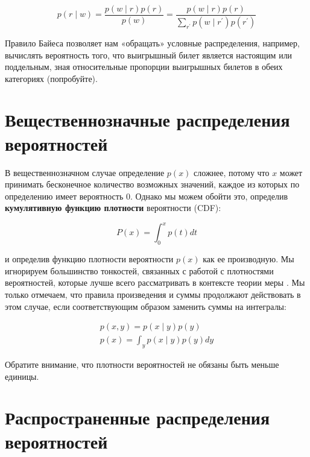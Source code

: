 \begin{equation}
    p(r\mid w)=\frac{p(w \mid r)p(r)}{p(w)} =\frac{p(w \mid r)p(r)}{\sum_{r^\prime}p(w \mid r^\prime)p(r^\prime)}
    \label{eq:bayes_rule}
\end{equation}

Правило Байеса позволяет нам «обращать» условные распределения, например, вычислять вероятность того, что выигрышный билет является настоящим или поддельным, зная относительные пропорции выигрышных билетов в обеих категориях (попробуйте).

\section{Вещественнозначные распределения вероятностей}

В вещественнозначном случае определение $p(x)$ сложнее, потому что $x$ может принимать бесконечное количество возможных значений, каждое из которых по определению имеет вероятность $0$. Однако мы можем обойти это, определив \textbf{кумулятивную функцию плотности} вероятности (CDF):

$$
P(x)=\int_{0}^xp(t)dt
$$

и определив функцию плотности вероятности $p(x)$ как ее производную. Мы игнорируем большинство тонкостей, связанных с работой с плотностями вероятностей, которые лучше всего рассматривать в контексте теории меры \cite{bogachev2007measure}. Мы только отмечаем, что правила произведения и суммы продолжают действовать в этом случае, если соответствующим образом заменить суммы на интегралы:

\begin{gather}
p(x,y)=p(x\mid y)p(y) \\
p(x)=\int_y p(x \mid y)p(y)dy
\end{gather}

Обратите внимание, что плотности вероятностей не обязаны быть меньше единицы.

\section{Распространенные распределения вероятностей}

